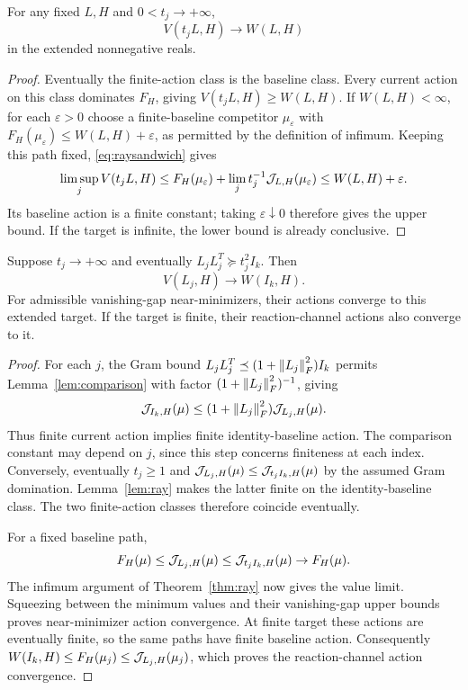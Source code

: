 \begin{theorem}\label{thm:ray}
For any fixed $L,H$ and $0<t_j\to+\infty$,
\[
 V(t_jL,H)\longrightarrow W(L,H)
\]
in the extended nonnegative reals.
\end{theorem}
\begin{proof}
Eventually the finite-action class is the baseline class. Every current
action on this class dominates $F_H$, giving $V(t_jL,H)\ge W(L,H)$.
If $W(L,H)<\infty$, for each $\varepsilon>0$ choose a finite-baseline
competitor $\mu_\varepsilon$ with
$F_H(\mu_\varepsilon)\le W(L,H)+\varepsilon$, as permitted by the
definition of infimum. Keeping this path fixed, \eqref{eq:raysandwich} gives
\[
 \limsup_j V(t_jL,H)\le F_H(\mu_\varepsilon)
       +\lim_j t_j^{-1}\mathcal J_{L,H}(\mu_\varepsilon)
 \le W(L,H)+\varepsilon.
\]
Its baseline action is a finite constant; taking $\varepsilon\downarrow0$
therefore gives the upper bound. If the target is infinite, the lower bound is
already conclusive.
\end{proof}

\begin{theorem}\label{thm:uniform}
Suppose $t_j\to+\infty$ and eventually $L_jL_j^T\succeq t_j^2I_k$.
Then
\[
 V(L_j,H)\longrightarrow W(I_k,H).
\]
For admissible vanishing-gap near-minimizers, their actions converge to this
extended target. If the target is finite, their reaction-channel actions
also converge to it.
\end{theorem}
\begin{proof}
For each $j$, the Gram bound
$L_jL_j^T\preceq(1+\left\lVert L_j\right\rVert_F^2)I_k$ permits
Lemma~\ref{lem:comparison} with factor $(1+\left\lVert L_j\right\rVert_F^2)^{-1}$,
giving
\[
 \mathcal J_{I_k,H}(\mu)\le(1+\left\lVert L_j\right\rVert_F^2)\mathcal J_{L_j,H}(\mu).
\]
Thus finite current action implies finite identity-baseline action.
The comparison constant may depend on $j$, since this step concerns
finiteness at each index. Conversely, eventually $t_j\ge1$ and
$\mathcal J_{L_j,H}(\mu)\le\mathcal J_{t_jI_k,H}(\mu)$ by the assumed Gram
domination. Lemma~\ref{lem:ray} makes the latter finite on the
identity-baseline class. The two finite-action classes therefore coincide
eventually.

For a fixed baseline path,
\[
 F_H(\mu)\le\mathcal J_{L_j,H}(\mu)\le\mathcal J_{t_jI_k,H}(\mu)\to F_H(\mu).
\]
The infimum argument of Theorem~\ref{thm:ray} now gives the value limit.
Squeezing between the minimum values and their vanishing-gap upper bounds
proves near-minimizer action convergence. At finite target these actions
are eventually finite, so the same paths have finite baseline action.
Consequently
$W(I_k,H)\le F_H(\mu_j)\le\mathcal J_{L_j,H}(\mu_j)$, which proves the
reaction-channel action convergence.
\end{proof}
